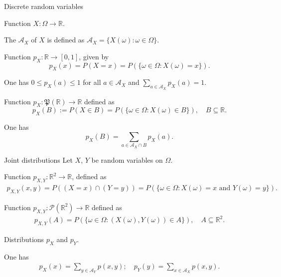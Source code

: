 \begin{frame}{Discrete random variables} 

\bit
\item 
Function $X:\Omega\to\mathbb{R}$. 
\item The  $\mathcal{A}_X$ of 
$X$ is defined as $\mathcal{A}_X=\{X(\omega)\colon \omega\in\Omega\}$. 
\eit
\smallskip
{} 
\bit
\item Function $p_X:\mathbb{R}\to [0,1]$, given by 
\[
p_X(x)=P(X=x)=P(\{\omega\in\Omega\colon X(\omega)=x\}).
\]
\item One has $0\leq p_X(a)\leq 1$ for all $a\in\mathcal{A}_X$ and $\sum_{a\in\mathcal{A}_X}p_X(a)=1$.
\eit
\smallskip
{} 
\bit
\item Function $p_X:\mathfrak{P}(\mathbb{R})\to \mathbb{R}$ defined as 
\[
p_X(B):=P(X\in B)=P(\{\omega\in\Omega\colon X(\omega)\in B\}),\quad B\subseteq\mathbb{R}.
\]
\item One has 
\[
p_X(B)=\sum_{a \in \mathcal{A}_X\cap B}p_X(a).
\]
\eit 
\end{frame}

\begin{frame}{Joint distributions}
 Let $X$, $Y$ be random variables on $\Omega$.

\bit
\item Function $p_{X,Y}:\mathbb{R}^2\to\mathbb{R}$, defined as 
\begin{align*}
p_{X,Y}(x,y)=P((X=x) \cap (Y=y))=P(\{\omega\in\Omega\colon X(\omega)=x\text{ and }Y(\omega)=y\}).
\end{align*}
\eit
{}
\bit
\item 
Function $p_{X,Y}:\mathcal{P}(\mathbb{R}^2)\to\mathbb{R}$ defined as 
\begin{align*}
p_{X,Y}(A)=P(\{\omega\in\Omega\colon (X(\omega),Y(\omega))\in A\}),\quad A\subseteq\mathbb{R}^2.
\end{align*}
\eit
{}
\bit
\item Distributions $p_X$ and $p_Y$.
\item One has 
\begin{align}\label{MarginalJoint}
p_X(x)=\sum_{y\in\mathcal{A}_Y}p(x,y);\quad p_Y(y)=\sum_{x\in\mathcal{A}_X}p(x,y). 
\end{align}
\eit 
\end{frame} 


